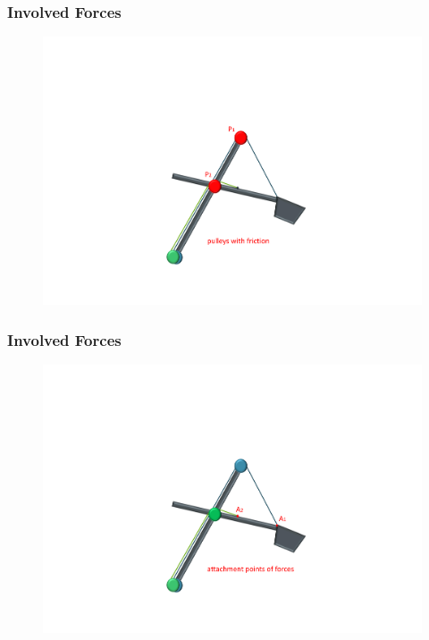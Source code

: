 \documentclass{beamer}
\begin{document}
\begin{frame}
	\frametitle{Involved Forces}
	
	\begin{figure}[bth]
	  \begin{center}
	    \includegraphics[trim=22cm 5cm 2cm 24cm, clip=true, 
	    width=\linewidth]{Exc/Excavator_Only2}
	  \end{center}
	\end{figure}

\end{frame}

\begin{frame}
	\frametitle{Involved Forces}
	
	\begin{figure}[bth]
	  \begin{center}
	    \includegraphics[trim=22cm 5cm 2cm 24cm, clip=true, 
	    width=\linewidth]{Exc/Excavator_Only3}
	  \end{center}
	\end{figure}

\end{frame}
\end{document}
